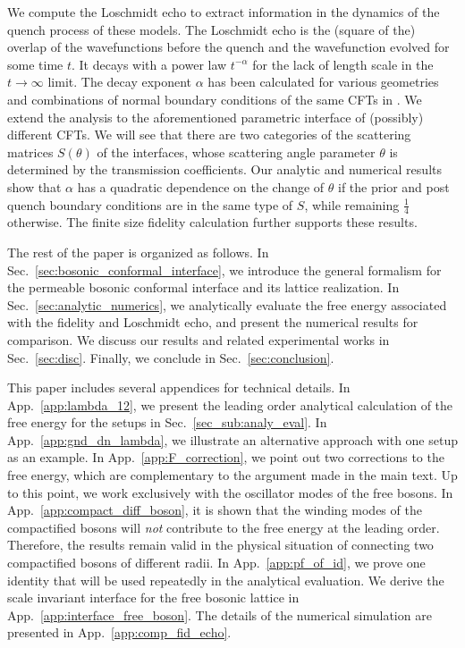 We compute the Loschmidt echo to extract information in the dynamics of the quench process of these models. The Loschmidt echo is the (square of the) overlap of the wavefunctions before the quench and the wavefunction evolved for some time $t$. It decays with a power law $t^{- \alpha}$ for the lack of length scale in the $t \rightarrow \infty$ limit. The decay exponent $\alpha$ has been calculated for various geometries and combinations of normal boundary conditions of the same CFTs in . We extend the analysis to the aforementioned parametric interface of (possibly) different CFTs. We will see that there are two categories of the scattering matrices $S(\theta)$ of the interfaces, whose scattering angle parameter $\theta$ is determined by the transmission coefficients. Our analytic and numerical results show that $\alpha$ has a quadratic dependence on the change of $\theta$ if the prior and post quench boundary conditions are in the same type of $S$, while remaining $\frac{1}{4}$ otherwise. The finite size fidelity calculation further supports these results. 

The rest of the paper is organized as follows. In Sec.~\ref{sec:bosonic_conformal_interface}, we introduce the general formalism for the permeable bosonic conformal interface and its lattice realization. In Sec.~\ref{sec:analytic_numerics}, we analytically evaluate the free energy associated with the fidelity and Loschmidt echo, and present the numerical results for comparison. We discuss our results and related experimental works in Sec.~\ref{sec:disc}. Finally, we conclude in Sec.~\ref{sec:conclusion}. 

This paper includes several appendices for technical details. In App.~\ref{app:lambda_12}, we present the leading order analytical calculation of the free energy for the setups in Sec.~\ref{sec_sub:analy_eval}. In App.~\ref{app:gnd_dn_lambda}, we illustrate an alternative approach with one setup as an example. In App.~\ref{app:F_correction}, we point out two corrections to the free energy, which are complementary to the argument made in the main text. Up to this point, we work exclusively with the oscillator modes of the free bosons. In App.~\ref{app:compact_diff_boson}, it is shown that the winding modes of the compactified bosons will \emph{not} contribute to the free energy at the leading order. Therefore, the results remain valid in the physical situation of connecting two compactified bosons of different radii. In App.~\ref{app:pf_of_id}, we prove one identity that will be used repeatedly in the analytical evaluation. We derive the scale invariant interface for the free bosonic lattice in App.~\ref{app:interface_free_boson}. The details of the numerical simulation are presented in App.~\ref{app:comp_fid_echo}.

